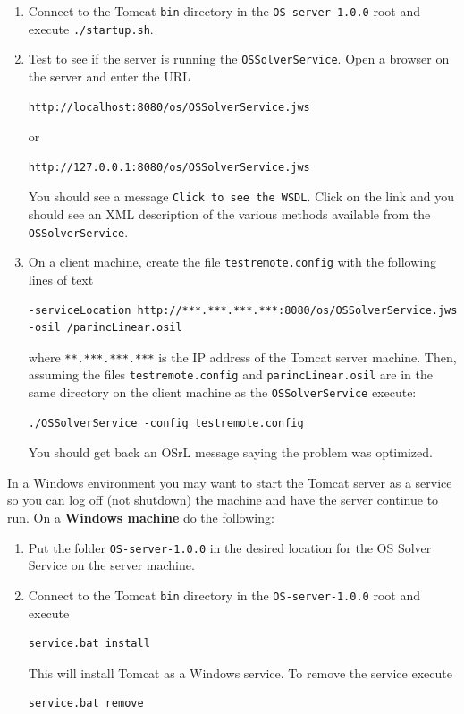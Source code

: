 \documentclass[11pt]{article}
\renewcommand{\_}{{\char"5F}}
\renewcommand{\{}{{\char"7B}}
\renewcommand{\}}{{\char"7D}}
\renewcommand{\^}{{\char"0D}}
\renewcommand{\'}{{\char"0D}}
\begin{document}
\begin{enumerate}[Step 1:]
\begin{enumerate}[Step 1.]
\item{} Connect to the Tomcat {\tt bin} directory in the {\tt OS-server-1.0.0} root and execute {\tt ./startup.sh}.

\item{} \label{itemize:tomcatunix3}
Test to see if the server is running the {\tt OSSolverService}.  Open a browser on the server and enter the URL
\begin{verbatim}
http://localhost:8080/os/OSSolverService.jws
\end{verbatim}
or
\begin{verbatim}
http://127.0.0.1:8080/os/OSSolverService.jws
\end{verbatim}
You should see a message {\tt Click to see the WSDL}.  Click on the link and you should see an XML description of
the various methods available from the {\tt OSSolverService}.

\item{}  \label{itemize:tomcatunix4}
On a client machine, create  the file {\tt testremote.config} with the following lines of text
\begin{verbatim}
-serviceLocation http://***.***.***.***:8080/os/OSSolverService.jws
-osil /parincLinear.osil
\end{verbatim}
where {\tt ***.***.***.***} is the IP address of the Tomcat server machine. Then, assuming the files
{\tt testremote.config} and {\tt parincLinear.osil} are in the same directory on the client machine as the
{\tt OSSolverService} execute:
\begin{verbatim}
./OSSolverService -config testremote.config
\end{verbatim}
You should get back an OSrL message saying the problem was optimized.

\end{enumerate}

In a Windows environment you may want to start the Tomcat server as a service so you can log off (not shutdown)
the machine and have the server continue to run. On a {\bf Windows machine} do the following:

\begin{enumerate}[Step 1.]

\item{}  Put the folder  {\tt OS-server-1.0.0}   in the desired location for the OS Solver Service on the server machine.

\item{} \label{itemize:tomcatwin2}  Connect to the Tomcat {\tt bin} directory in the {\tt OS-server-1.0.0} root and execute
\begin{verbatim}
service.bat install
\end{verbatim}
This will install Tomcat as a Windows service.  To remove the service execute
\begin{verbatim}
service.bat remove
\end{verbatim}


\end{enumerate}
\end{enumerate}
\end{document}
